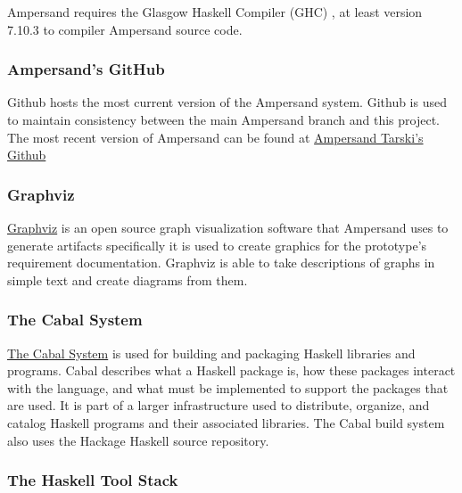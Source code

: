 \documentclass[journal,12pt,onecolumn,draftclsnofoot]{article}
\let\Oldsubsubsection\subsubsection
\renewcommand{\subsubsection}{\FloatBarrier\Oldsubsubsection}
\begin{document}
Ampersand requires the Glasgow Haskell Compiler (GHC) \cite{ghc}, at least version 
7.10.3 to compiler Ampersand source code. 

\subsubsection*{Ampersand's GitHub}\label{Github}

Github hosts the most current version of the Ampersand system. Github is used 
to maintain consistency between the main Ampersand branch and this project. The 
most recent version of Ampersand can be found at 
\href{https://github.com/AmpersandTarski}{Ampersand Tarski's Github }

\subsubsection*{Graphviz}

\href{http://www.softpedia.com/get/Others/Miscellaneous/Graphviz.shtml}{Graphviz}
 is an open source graph visualization software that Ampersand uses to generate 
 artifacts specifically it is used to create graphics for the prototype's 
 requirement documentation. Graphviz is able to take descriptions of graphs in 
 simple text and create diagrams from them. 

\subsubsection*{The Cabal System}

 

\href{https://www.haskell.org/cabal/}{The Cabal System} is used for building 
and packaging Haskell libraries and programs. 
Cabal describes what a Haskell package is, how these packages interact with the 
language, and what must be implemented to support the packages that are used. 
It is part of a larger infrastructure used to distribute, organize, and catalog 
Haskell programs and their associated libraries. The Cabal build system
also uses the Hackage \cite{hackage} Haskell source repository.

\subsubsection*{The Haskell Tool Stack}
\end{document}
